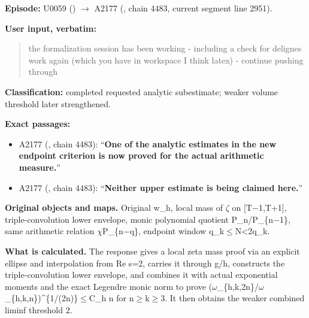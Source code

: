 \documentclass[10pt,a4paper,oneside]{report}
\providecommand{\tightlist}{\setlength{\itemsep}{0pt}\setlength{\parskip}{0pt}}
\begin{document}
\textbf{Episode:} U0059
(\protect{})
\allowbreak{}\ensuremath{→}\allowbreak{} A2177
(\protect{}, chain 4483,
current segment line 2951).

\textbf{User input, verbatim:}

\begin{quote}
the formalization session has been working - including a check for
delignes work again (which you have in workspace I think latex) -
continue pushing through
\end{quote}

\textbf{Classification:} completed requested analytic subestimate;
weaker volume threshold later strengthened.

\textbf{Exact passages:}

\begin{itemize}
\tightlist
\item
  A2177 (\protect{}, chain
  4483): ``\textbf{One of the analytic estimates in the new endpoint
  criterion is now proved for the actual arithmetic measure.}''
\item
  A2177 (\protect{}, chain
  4483): ``\textbf{Neither upper estimate is being claimed here.}''
\end{itemize}

\textbf{Original objects and maps.} Original w\_h, local mass of
\allowbreak{}\ensuremath{ζ}\allowbreak{} on
[T\allowbreak{}\ensuremath{−}\allowbreak{}1,T+1], triple-convolution
lower envelope, monic polynomial quotient
P\_n/P\_\{n\allowbreak{}\ensuremath{−}\allowbreak{}1\}, same arithmetic
relation
\allowbreak{}\ensuremath{χ}\allowbreak{}P\_\{n\allowbreak{}\ensuremath{−}\allowbreak{}q\},
endpoint window q\_k\allowbreak{}\ensuremath{≤}\allowbreak{}N<2q\_k.

\textbf{What is calculated.} The response gives a local zeta mass proof
via an explicit ellipse and interpolation from Re s=2, carries it
through g/h, constructs the triple-convolution lower envelope, and
combines it with actual exponential moments and the exact Legendre monic
norm to prove
(\allowbreak{}\ensuremath{ω}\allowbreak{}\_\{h,k,2n\}/\allowbreak{}\ensuremath{ω}\allowbreak{}\_\{h,k,n\})\textasciicircum{}\{1/(2n)\}\allowbreak{}\ensuremath{≤}\allowbreak{}C\_h
n for
n\allowbreak{}\ensuremath{≥}\allowbreak{}k\allowbreak{}\ensuremath{≥}\allowbreak{}3.
It then obtains the weaker combined liminf threshold 2.
\end{document}
